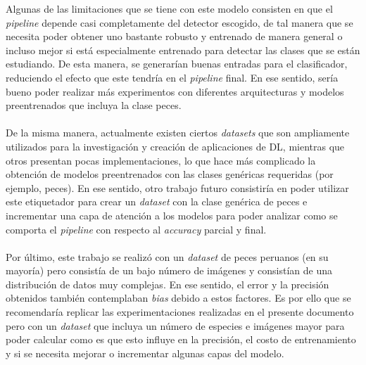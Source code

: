 Algunas de las limitaciones que se tiene con este modelo consisten en que el 
\textit{pipeline} depende casi completamente del detector escogido, de tal 
manera que se necesita poder obtener uno bastante robusto y entrenado de 
manera general o incluso mejor si está especialmente entrenado para detectar 
las clases que se están estudiando. De esta manera, se generarían buenas 
entradas para el clasificador, reduciendo el efecto que este tendría en el 
\textit{pipeline} final. En ese sentido, sería bueno poder realizar más 
experimentos con diferentes arquitecturas y modelos preentrenados que incluya 
la clase peces.
\\\\
De la misma manera, actualmente existen ciertos \textit{datasets} que son 
ampliamente utilizados para la investigación y creación de aplicaciones de 
DL, mientras que otros presentan pocas implementaciones, lo que hace más 
complicado la obtención de modelos preentrenados con las clases genéricas 
requeridas (por ejemplo, peces). En ese sentido, otro trabajo futuro 
consistiría en poder utilizar este etiquetador para crear un \textit{dataset} 
con la clase genérica de peces e incrementar una capa de atención a los modelos 
para poder analizar como se comporta el \textit{pipeline} con respecto al 
\textit{accuracy} parcial y final.   
\\\\
Por último, este trabajo se realizó con un \textit{dataset} de peces peruanos 
(en su mayoría) pero consistía de un bajo número de imágenes y consistían de 
una distribución de datos muy complejas. En ese sentido, el error y la 
precisión obtenidos también contemplaban \textit{bias} debido a estos factores. 
Es por ello que se recomendaría replicar las experimentaciones realizadas en 
el presente documento pero con un \textit{dataset} que incluya un número de 
especies e imágenes mayor para poder calcular como es que esto influye en la 
precisión, el costo de entrenamiento y si se necesita mejorar o incrementar 
algunas capas del modelo.
